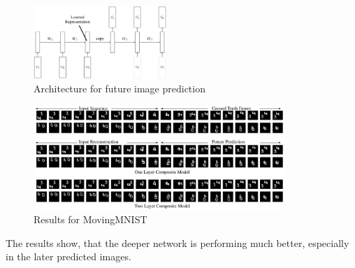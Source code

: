   \begin{figure}[H]
   \includegraphics[width=0.45\textwidth]{../Images/srivastava.png}
   \centering
   \caption{Architecture for future image prediction \cite{Srivastava2015}}
   \label{fig:lstm_architecture}
  \end{figure}
  \begin{figure}[H]
   \includegraphics[width=0.85\textwidth]{../Images/srivastava_results_mnist.png}
   \centering
   \caption{Results for MovingMNIST \cite{Srivastava2015}}
   \label{fig:lstm_results}
  \end{figure}\noindent
  The results show, that the deeper network is performing much better, especially in the later predicted images.

